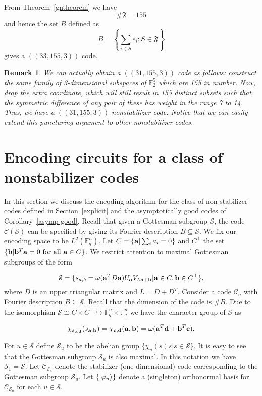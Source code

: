 \documentclass{Rinton-P9x6}
\newtheorem{remark}[theorem]{Remark}
\newcommand {\ket} [1] {\ensuremath \left\vert#1\ensuremath \right\rangle}
\newcommand{\GF}[2][]{{\ensuremath{\mathbb{F}_{#2}^{#1}}}}
\renewcommand{\a}{{\bf a}}
\renewcommand{\b}{{\bf b}}
\renewcommand{\c}{{\bf c}}
\renewcommand{\d}{{\bf d}}
\newcommand{\C}{{\ensuremath{\mathcal{C}}}}
\renewcommand{\S}{{\ensuremath{\mathcal{S}}}}
\begin{document}
{From} Theorem~\ref{gntheorem} we have 
\[
\# \mathfrak{F} = 155
\] and hence the set $B$ defined as
\[
B = \left\{ \sum_{i \in S} e_i : S \in \mathfrak{F} \right\}
\] gives a $((33,155,3))$ code.

\begin{remark}
We can actually obtain a $((31,155,3))$ code as follows: construct the
same family of 3-dimensional subspaces of $\GF[5]{2}$ which are 155 in
number. Now, drop the extra coordinate, which will still result in 155
distinct subsets such that the symmetric difference of any pair of
these has weight in the range 7 to 14. Thus, we have a $((31,155,3))$
nonstabilizer code. Notice that we can easily extend this puncturing 
argument to other nonstabilizer codes.
\end{remark}

\section{Encoding circuits for a class of nonstabilizer codes}

In this section we discuss the encoding algorithm for the class of
non-stabilizer codes defined in Section~\ref{explicit} and the
asymptotically good codes of Corollary~\ref{asymp-good}. Recall that
given a Gottesman subgroup $\S$, the code $\C(\S)$ can be specified by
giving its Fourier description $B\subseteq\S$. We fix our encoding
space to be $L^2(\GF[n]{q})$.  Let \mbox{$C = \{ \a | \sum_i a_i = 0
  \}$} and $C^\perp$ the set $\{ \b | \b^T \a = 0 \textrm{ for all }
\a \in C\}$.  We restrict attention to maximal Gottesman subgroups of
the form

\[
\S = \{s_{a,b} = \omega( \a^T D \a ) U_\a V_{L\a + \b} | \a \in C, \b
\in C^\perp \},
\] 
where $D$ is an upper triangular matrix and $L = D+D^T$. Consider a
code $\C_n$ with Fourier description $B \subseteq \S$. Recall that the
dimension of the code is $\#B$. Due to the isomorphism $\S \cong C
\times C^\perp \hookrightarrow \GF[n]{q} \times \GF[n]{q}$ we have the
character group of $\S$ as

\[
 \chi_{s_{\c,\d}}(s_{\a,\b}) = \chi_{\c,\d}(\a,\b) = \omega(\a^T\d +
\b^T \c).
\]

For $u \in \S$ define $\S_u$ to be the abelian group $\{ \chi_u(s) s |
s \in \S\}$. It is easy to see that the Gottesman subgroup $\S_u$ is
also maximal. In this notation we have $\S_1 = \S$. Let
$\mathcal{C}_{\S_u}$ denote the stabilizer (one dimensional) code
corresponding to the Gottesman subgroup $\S_u$.  Let
$\{\ket{\varphi_u}\}$ denote a (singleton) orthonormal basis for
$\mathcal{C}_{\S_u}$ for each $u\in\S$.
\end{document}

